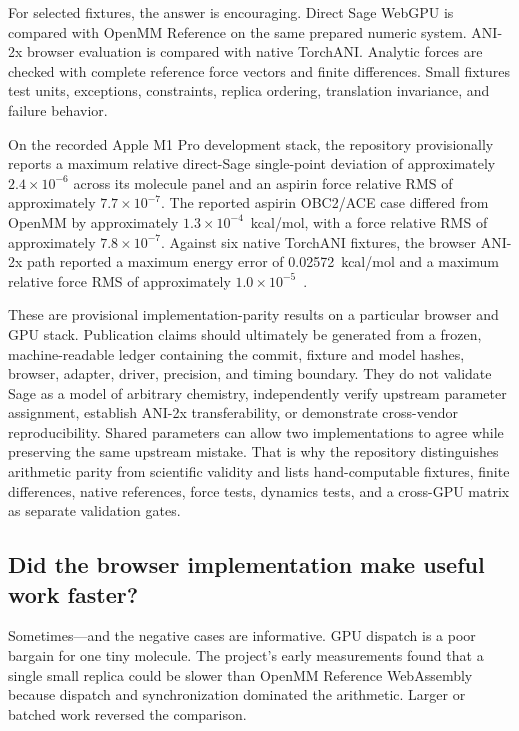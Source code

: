 \documentclass[11pt]{article}
\begin{document}
For selected fixtures, the answer is encouraging.
Direct Sage WebGPU is compared with OpenMM Reference on the same prepared numeric system.
ANI-2x browser evaluation is compared with native TorchANI.
Analytic forces are checked with complete reference force vectors and finite differences.
Small fixtures test units, exceptions, constraints, replica ordering, translation invariance, and failure behavior.

On the recorded Apple M1 Pro development stack, the repository provisionally reports a maximum relative direct-Sage single-point deviation of approximately $2.4\times10^{-6}$ across its molecule panel and an aspirin force relative RMS of approximately $7.7\times10^{-7}$.
The reported aspirin OBC2/ACE case differed from OpenMM by approximately $1.3\times10^{-4}$~kcal/mol, with a force relative RMS of approximately $7.8\times10^{-7}$.
Against six native TorchANI fixtures, the browser ANI-2x path reported a maximum energy error of 0.02572~kcal/mol and a maximum relative force RMS of approximately $1.0\times10^{-5}$~\cite{wiewiora2026molarium}.

These are provisional implementation-parity results on a particular browser and GPU stack.
Publication claims should ultimately be generated from a frozen, machine-readable ledger containing the commit, fixture and model hashes, browser, adapter, driver, precision, and timing boundary.
They do not validate Sage as a model of arbitrary chemistry, independently verify upstream parameter assignment, establish ANI-2x transferability, or demonstrate cross-vendor reproducibility.
Shared parameters can allow two implementations to agree while preserving the same upstream mistake.
That is why the repository distinguishes arithmetic parity from scientific validity and lists hand-computable fixtures, finite differences, native references, force tests, dynamics tests, and a cross-GPU matrix as separate validation gates.

\subsection{Did the browser implementation make useful work faster?}

Sometimes---and the negative cases are informative.
GPU dispatch is a poor bargain for one tiny molecule.
The project's early measurements found that a single small replica could be slower than OpenMM Reference WebAssembly because dispatch and synchronization dominated the arithmetic.
Larger or batched work reversed the comparison.
\end{document}
